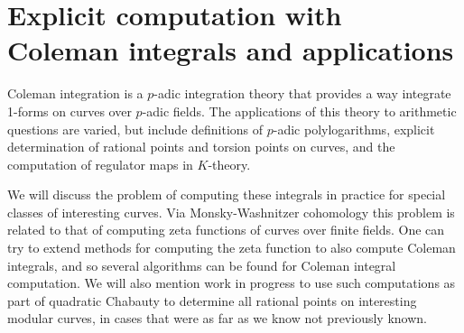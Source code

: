 \hypertarget{explicit-computation-with-coleman-integrals-and-applications}{%
\section{Explicit computation with Coleman integrals and
applications}\label{explicit-computation-with-coleman-integrals-and-applications}}

Coleman integration is a \(p\)-adic integration theory that provides a
way integrate 1-forms on curves over \(p\)-adic fields. The applications
of this theory to arithmetic questions are varied, but include
definitions of \(p\)-adic polylogarithms, explicit determination of
rational points and torsion points on curves, and the computation of
regulator maps in \(K\)-theory.

We will discuss the problem of computing these integrals in practice for
special classes of interesting curves. Via Monsky-Washnitzer cohomology
this problem is related to that of computing zeta functions of curves
over finite fields. One can try to extend methods for computing the zeta
function to also compute Coleman integrals, and so several algorithms
can be found for Coleman integral computation. We will also mention work
in progress to use such computations as part of quadratic Chabauty to
determine all rational points on interesting modular curves, in cases
that were as far as we know not previously known.
